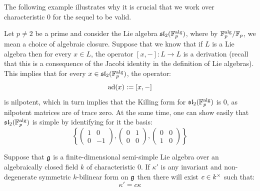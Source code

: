             \begin{example}
                The following example illustrates why it is crucial that we work over characteristic $0$ for the sequel to be valid.

                Let $p \not = 2$ be a prime and consider the Lie algebra $\mathfrak{sl}_2(\mathbb{F}_p^{\mathrm{alg}})$, where by $\mathbb{F}_p^{\mathrm{alg}}/\mathbb{F}_p$, we mean a choice of algebraic closure. Suppose that we know that if $L$ is a Lie algebra then for every $x \in L$, the operator $[x, -]: L \to L$ is a derivation (recall that this is a consequence of the Jacobi identity in the definition of Lie algebras). This implies that for every $x \in \mathfrak{sl}_2(\mathbb{F}_p^{\mathrm{alg}})$, the operator:
                    $$\mathrm{ad}(x) := [x, -]$$
                is nilpotent, which in turn implies that the Killing form for $\mathfrak{sl}_2(\mathbb{F}_p^{\mathrm{alg}})$ is $0$, as nilpotent matrices are of trace zero. At the same time, one can show easily that $\mathfrak{sl}_2(\mathbb{F}_p^{\mathrm{alg}})$ is simple by identifying for it the basis:
                    $$\left\{ \begin{pmatrix} 1 & 0 \\ 0 & -1 \end{pmatrix}, \begin{pmatrix} 0 & 1 \\ 0 & 0 \end{pmatrix}, \begin{pmatrix} 0 & 0 \\ 1 & 0 \end{pmatrix} \right\}$$
            \end{example}
            \begin{proposition} \label{prop: killing_form_uniqueness}
                Suppose that $\mathfrak{g}$ is a finite-dimensional semi-simple Lie algebra over an algebraically closed field $k$ of characteristic $0$. If $\kappa'$ is any invariant and non-degenerate symmetric $k$-bilinear form on $\mathfrak{g}$ then there will exist $c \in k^{\x}$ such that:
                    $$\kappa' = c \kappa$$
            \end{proposition}

